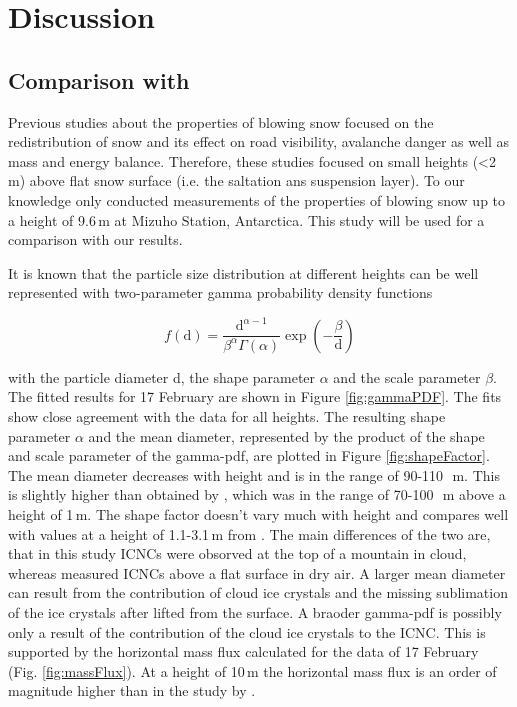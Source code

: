\documentclass[draft,linenumbers]{agujournal}
\begin{document}
\section{Discussion}
\label{Discussion}

\subsection{Comparison with \citet{Nis05}}
Previous studies about the properties of blowing snow focused on the redistribution of snow and its effect on road visibility, avalanche danger as well as mass and energy balance. Therefore, these studies focused on small heights (<2\,\si{m}) above flat snow surface (i.e. the saltation ans suspension layer). To our knowledge only \citet{Nis05} conducted measurements of the properties of blowing snow up to a height of 9.6\,\si{m} at Mizuho Station, Antarctica. This study will be used for a comparison with our results. 

It is known that the particle size distribution at different heights can be well represented with two-parameter gamma probability density functions \citep{Bud66, Sch82} 

\begin{linenomath*}
\begin{equation}
f(\text{d}) = \frac{\text{d}^{\alpha - 1}}{\beta^{\alpha} \Gamma\left(\alpha\right)}\exp\left(-\frac{\beta}{\text{d}}\right) 
\end{equation}
\end{linenomath*}

with the particle diameter d, the shape parameter $\alpha$ and the scale parameter $\beta$. The fitted results for 17 February are shown in Figure \ref{fig:gammaPDF}. The fits show close agreement with the data for all heights. The resulting shape parameter $\alpha$ and the mean diameter, represented by the product of the shape and scale parameter of the gamma-pdf, are plotted in Figure \ref{fig:shapeFactor}. The mean diameter decreases with height and is in the range of 90-110\,\si{\mu m}. This is slightly higher than obtained by \citet{Nis05}, which was in the range of 70-100\,\si{\mu m} above a height of 1\,\si{m}. The shape factor doesn't vary much with height and compares well with values at a height of 1.1-3.1\,\si{m} from \citet{Nis05}. The main differences of the two are, that in this study ICNCs were obsorved at the top of a mountain in cloud, whereas \citet{Nis05} measured ICNCs above a flat surface in dry air. A larger mean diameter can result from the contribution of cloud ice crystals and the missing sublimation of the ice crystals after lifted from the surface. A braoder gamma-pdf is possibly only a result of the contribution of the cloud ice crystals to the ICNC. This is supported by the horizontal mass flux calculated for the data of 17 February (Fig. \ref{fig:massFlux}). At a height of 10\,\si{m} the horizontal mass flux is an order of magnitude higher than in the study by \citet{Nis05}.
\end{document}

